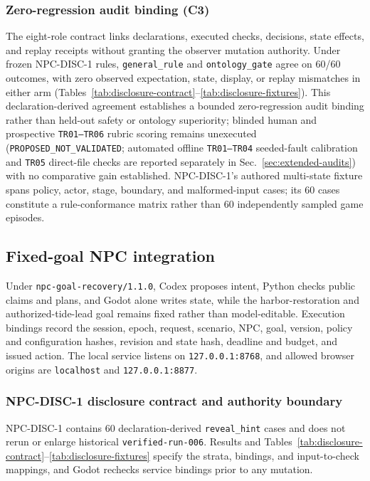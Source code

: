 \documentclass[journal]{IEEEtran}
\begin{document}
\subsubsection{Zero-regression audit binding (C3)}
The eight-role contract links declarations, executed checks, decisions, state effects, and replay receipts without granting the observer mutation authority. Under frozen NPC-DISC-1 rules, \texttt{general\_rule} and \texttt{ontology\_gate} agree on 60/60 outcomes, with zero observed expectation, state, display, or replay mismatches in either arm (Tables~\ref{tab:disclosure-contract}--\ref{tab:disclosure-fixtures}). This declaration-derived agreement establishes a bounded zero-regression audit binding rather than held-out safety or ontology superiority; blinded human and prospective \texttt{TR01--TR06} rubric scoring remains unexecuted (\texttt{PROPOSED\_NOT\_VALIDATED}; automated offline \texttt{TR01--TR04} seeded-fault calibration and \texttt{TR05} direct-file checks are reported separately in Sec.~\ref{sec:extended-audits}) with no comparative gain established.
NPC-DISC-1's authored multi-state fixture spans policy, actor, stage, boundary, and malformed-input cases; its 60 cases constitute a rule-conformance matrix rather than 60 independently sampled game episodes.

\subsection{Fixed-goal NPC integration}
Under \texttt{npc-goal-recovery/1.1.0}, Codex proposes intent, Python checks public claims and plans, and Godot alone writes state, while the harbor-restoration and authorized-tide-lead goal remains fixed rather than model-editable. Execution bindings record the session, epoch, request, scenario, NPC, goal, version, policy and configuration hashes, revision and state hash, deadline and budget, and issued action. The local service listens on \texttt{127.0.0.1:8768}, and allowed browser origins are \texttt{localhost} and \texttt{127.0.0.1:8877}.
\subsubsection{NPC-DISC-1 disclosure contract and authority boundary}\label{sec:disclosure-contract}
NPC-DISC-1 contains 60 declaration-derived \texttt{reveal\_hint} cases and does not rerun or enlarge historical \texttt{verified-run-006}. Results and Tables~\ref{tab:disclosure-contract}--\ref{tab:disclosure-fixtures} specify the strata, bindings, and input-to-check mappings, and Godot rechecks service bindings prior to any mutation.
 
\end{document}
